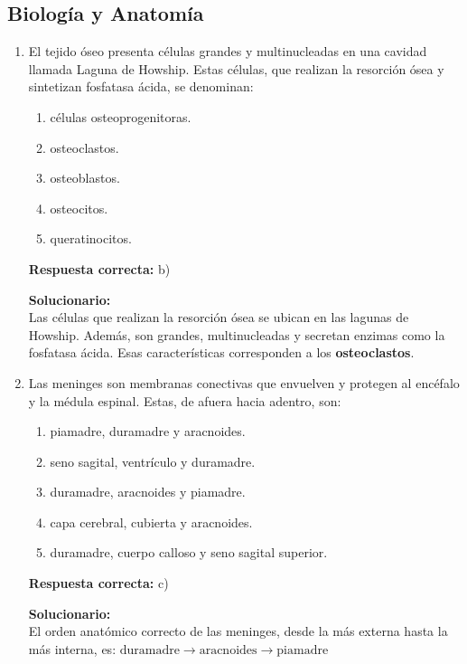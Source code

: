 \subsection*{Biología y Anatomía}

\begin{enumerate}
	
	\item El tejido óseo presenta células grandes y multinucleadas en una cavidad llamada Laguna de Howship. Estas células, que realizan la resorción ósea y sintetizan fosfatasa ácida, se denominan:
	\begin{enumerate}[label=\alph*)]
		\item células osteoprogenitoras.
		\item osteoclastos.
		\item osteoblastos.
		\item osteocitos.
		\item queratinocitos.
	\end{enumerate}
	\textbf{Respuesta correcta:} b)
	
	\vspace{2mm}
	\textbf{Solucionario:}\\
	Las células que realizan la resorción ósea se ubican en las lagunas de Howship. Además, son grandes, multinucleadas y secretan enzimas como la fosfatasa ácida. Esas características corresponden a los \textbf{osteoclastos}.
	
	\vspace{6mm}
	
	\item Las meninges son membranas conectivas que envuelven y protegen al encéfalo y la médula espinal. Estas, de afuera hacia adentro, son:
	\begin{enumerate}[label=\alph*)]
		\item piamadre, duramadre y aracnoides.
		\item seno sagital, ventrículo y duramadre.
		\item duramadre, aracnoides y piamadre.
		\item capa cerebral, cubierta y aracnoides.
		\item duramadre, cuerpo calloso y seno sagital superior.
	\end{enumerate}
	\textbf{Respuesta correcta:} c)
	
	\vspace{2mm}
	\textbf{Solucionario:}\\
	El orden anatómico correcto de las meninges, desde la más externa hasta la más interna, es:
	$ \text{duramadre} \rightarrow \text{aracnoides} \rightarrow \text{piamadre} $
	

\end{enumerate}

